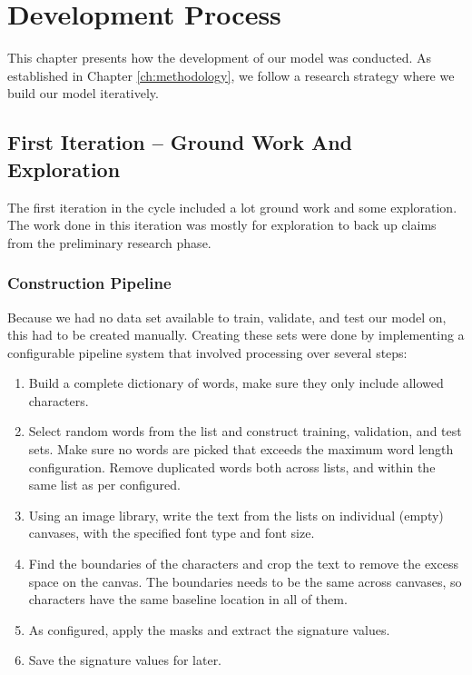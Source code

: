 
\chapter{Development Process}
\label{ch:development_process}
This chapter presents how the development of our model was conducted. As established in Chapter \ref{ch:methodology}, we follow a research strategy where we build our model iteratively.


\section{First Iteration -- Ground Work And Exploration}
The first iteration in the cycle included a lot ground work and some exploration. The work done in this iteration was mostly for exploration to back up claims from the preliminary research phase.

\subsection{Construction Pipeline}
\label{sec:construction_pipeline}
Because we had no data set available to train, validate, and test our model on, this had to be created manually. Creating these sets were done by implementing a configurable pipeline system that involved processing over several steps:

\begin{enumerate}
    \item Build a complete dictionary of words, make sure they only include allowed characters.
    \item Select random words from the list and construct training, validation, and test sets. Make sure no words are picked that exceeds the maximum word length configuration. Remove duplicated words both across lists, and within the same list as per configured.
    \item Using an image library, write the text from the lists on individual (empty) canvases, with the specified font type and font size.
    \item Find the boundaries of the characters and crop the text to remove the excess space on the canvas. The boundaries needs to be the same across canvases, so characters have the same baseline location in all of them.
    \item As configured, apply the masks and extract the signature values.
    \item Save the signature values for later.
\end{enumerate}

